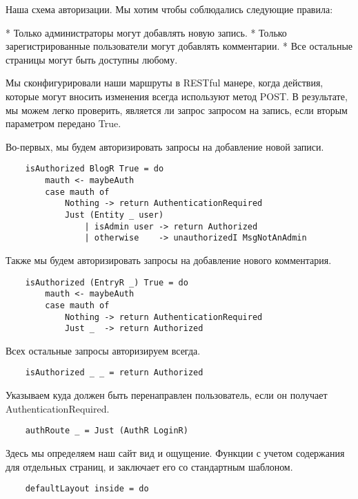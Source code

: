 Наша схема авторизации. Мы хотим чтобы соблюдались следующие правила:

* Только администраторы могут добавлять новую запись. 
* Только зарегистрированные пользователи могут добавлять комментарии. 
* Все остальные страницы могут быть доступны любому.  


Мы сконфигурировали наши маршруты в RESTful манере, когда действия, которые могут вносить изменения всегда используют метод POST. В результате, мы можем легко проверить, является ли запрос запросом на запись, если вторым параметром передано True.

Во-первых, мы будем авторизировать запросы на добавление новой записи. 
 
\begin{lstlisting}
    isAuthorized BlogR True = do
        mauth <- maybeAuth
        case mauth of
            Nothing -> return AuthenticationRequired
            Just (Entity _ user)
                | isAdmin user -> return Authorized
                | otherwise    -> unauthorizedI MsgNotAnAdmin
\end{lstlisting}

Также мы будем авторизировать запросы на добавление нового комментария. 
 
\begin{lstlisting}
    isAuthorized (EntryR _) True = do
        mauth <- maybeAuth
        case mauth of
            Nothing -> return AuthenticationRequired
            Just _  -> return Authorized
\end{lstlisting}
 
Всех остальные запросы авторизируем всегда.
 
\begin{lstlisting}
    isAuthorized _ _ = return Authorized
\end{lstlisting}
 
Указываем куда должен быть перенаправлен пользователь, если он получает AuthenticationRequired. 
 
\begin{lstlisting}
    authRoute _ = Just (AuthR LoginR)
\end{lstlisting}
 
Здесь мы определяем наш сайт вид и ощущение.  Функции с учетом содержания для отдельных страниц, и заключает его со стандартным шаблоном. 
 
\begin{lstlisting}
    defaultLayout inside = do
\end{lstlisting}
 
